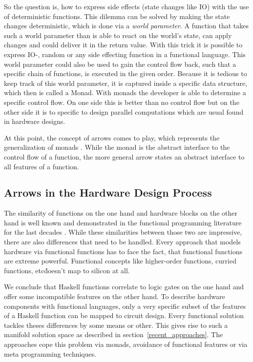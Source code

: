 \documentclass[9pt,final,a4paper,leqno]{article}
\begin{document}
\par
So the question is, how to express side effects (state changes like IO) with the use of deterministic functions. This dilemma can be solved
by making the state changes deterministic, which is done via a \emph{world parameter}. A function that takes such a world parameter than
is able to react on the world's state, can apply changes and could deliver it in the return value. With this trick it is possible to express
IO-, random or any side effecting function in a functional language. This world parameter could also be used to gain the control flow back,
such that a specific chain of functions, is executed in the given order. Because it is tedious to keep track of this world parameter, it is
captured inside a specific data structure, which then is called a Monad. With monads the developer is able to determine a specific control
flow. On one side this is better than no control flow but on the other side it is to specific to design parallel computations which are
usual found in hardware designs. 

\par
At this point, the concept of arrows comes to play, which represents the generalization of monads \cite{Hughes98generalisingmonads}. While
the monad is the abstract interface to the control flow of a function, the more general arrow states an abstract interface to all features
of a function.


\subsection{Arrows in the Hardware Design Process}
The similarity of functions on the one hand and hardware blocks on the other hand is well known and demonstrated in the functional
programming literature for the last decades \cite{sheeran:perfect_match,donnell}. While these similarities between those two are impressive,
there are also differences that need to be handled. Every approach that models hardware via functional functions has to face the fact, that
functional functions are extreme powerful. Functional concepts like higher-order functions, curried functions, etc\. doesn't map to silicon at
all. 

\par
We conclude that Haskell functions correlate to logic gates on the one hand and offer some incompatible features on the other hand. To
describe hardware components with functional languages, only a very specific subset of the features of a Haskell function can be mapped to
circuit design. Every functional solution tackles theses differences by some means or other. This gives rise to such a manifold solution
space as described in section~\ref{recent_approaches}. The approaches cope this problem via monads, avoidance of functional features or via
meta programming techniques. 
\end{document}
